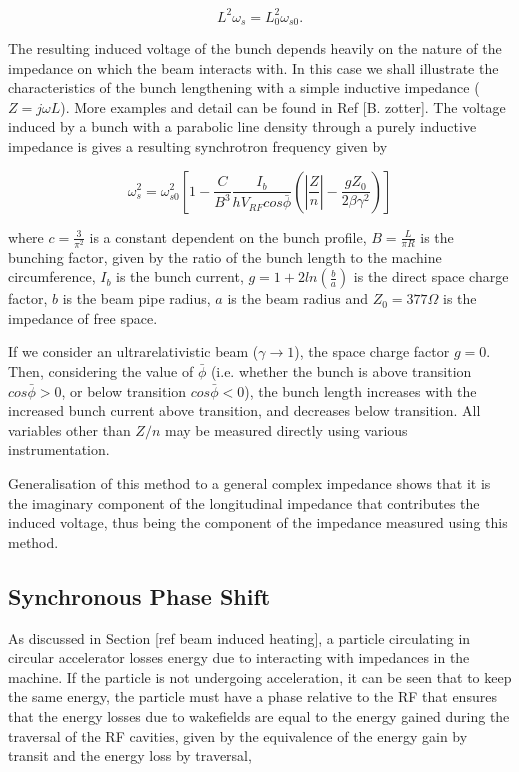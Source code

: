 \begin{equation}
L^{2}\omega_{s} = L_{0}^{2}\omega_{s0}.
\end{equation}

The resulting induced voltage of the bunch depends heavily on the nature of the impedance on which the beam interacts with. In this case we shall illustrate the characteristics of the bunch lengthening with a simple inductive impedance ($Z = j\omega L$). More examples and detail can be found in Ref [B. zotter]. The voltage induced by a bunch with a parabolic line density through a purely inductive impedance is gives a resulting synchrotron frequency given by

\begin{equation}
\omega_{s}^{2} = \omega_{s0}^{2}\left[ 1 - \frac{C}{B^{3}} \frac{I_{b}}{hV_{RF}cos\bar{\phi}} \left( \left| \frac{Z}{n}  \right| - \frac{gZ_{0}}{2\beta\gamma^{2}}   \right)    \right]
\end{equation}

where $c = \frac{3}{\pi^{2}}$ is a constant dependent on the bunch profile, $B = \frac{L}{\pi R}$ is the bunching
factor, given by the ratio of the bunch length to the machine circumference, $I_{b}$ is the bunch current, $g = 1 + 2ln\left(\frac{b}{a} \right)$ is the direct space charge factor, $b$ is the beam pipe radius, $a$ is the beam radius and $Z_{0} = 377\Omega$ is the impedance of free space.

If we consider an ultrarelativistic beam ($\gamma \rightarrow 1$), the space charge factor $g = 0$. Then, considering the value of $\bar{\phi}$ (i.e. whether the bunch is above transition $cos\bar{\phi} > 0$, or below transition $cos\bar{\phi} < 0$), the bunch length increases with the increased bunch current above transition, and decreases below transition. All variables other than $Z/n$ may be measured directly using various instrumentation.

Generalisation of this method to a general complex impedance shows that it is the imaginary component of the longitudinal impedance that contributes the induced voltage, thus being the component of the impedance measured using this method.

\subsection{Synchronous Phase Shift}

As discussed in Section [ref beam induced heating], a particle circulating in circular accelerator losses energy due to interacting with impedances in the machine. If the particle is not undergoing acceleration, it can be seen that to keep the same energy, the particle must have a phase relative to the RF that ensures that the energy losses due to wakefields are equal to the energy gained during the traversal of the RF cavities, given by the equivalence of the energy gain by transit and the energy loss by traversal,

